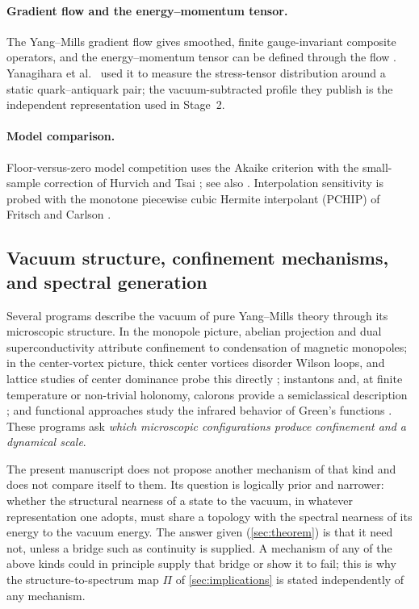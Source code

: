 \documentclass[11pt,a4paper]{article}
\theoremstyle{definition}
\theoremstyle{remark}
\begin{document}
\paragraph{Gradient flow and the energy--momentum tensor.} The Yang--Mills gradient flow \cite{Luscher10} gives smoothed, finite gauge-invariant composite operators, and the energy--momentum tensor can be defined through the flow \cite{Suzuki13}. Yanagihara et al.\ \cite{Yanagihara19} used it to measure the stress-tensor distribution around a static quark--antiquark pair; the vacuum-subtracted profile they publish is the independent representation used in Stage~2.

\paragraph{Model comparison.} Floor-versus-zero model competition uses the Akaike criterion \cite{Akaike74} with the small-sample correction of Hurvich and Tsai \cite{HurvichTsai89}; see also \cite{BurnhamAnderson02}. Interpolation sensitivity is probed with the monotone piecewise cubic Hermite interpolant (PCHIP) of Fritsch and Carlson \cite{FritschCarlson80}.

\subsection{Vacuum structure, confinement mechanisms, and spectral generation}
Several programs describe the vacuum of pure Yang--Mills theory through its microscopic structure. In the monopole picture, abelian projection and dual superconductivity \cite{tHooft78,tHooft81} attribute confinement to condensation of magnetic monopoles; in the center-vortex picture, thick center vortices disorder Wilson loops, and lattice studies of center dominance probe this directly \cite{DelDebbio97,Greensite03}; instantons and, at finite temperature or non-trivial holonomy, calorons provide a semiclassical description \cite{Belavin75,SchaferShuryak98,Kraan98}; and functional approaches study the infrared behavior of Green's functions \cite{AlkoferSmekal01}. These programs ask \emph{which microscopic configurations produce confinement and a dynamical scale}.

The present manuscript does not propose another mechanism of that kind and does not compare itself to them. Its question is logically prior and narrower: whether the structural nearness of a state to the vacuum, in whatever representation one adopts, must share a topology with the spectral nearness of its energy to the vacuum energy. The answer given (\cref{sec:theorem}) is that it need not, unless a bridge such as continuity is supplied. A mechanism of any of the above kinds could in principle supply that bridge or show it to fail; this is why the structure-to-spectrum map $\Pi$ of \cref{sec:implications} is stated independently of any mechanism.
\end{document}
